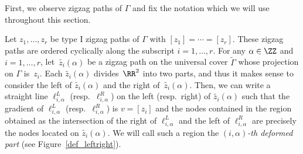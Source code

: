 First, we observe zigzag paths of $\Gamma$ and fix the notation which we will use throughout this section.

\begin{observation}\label{obs_deformed_part}
Let $z_1,\dots,z_r$ be type I zigzag paths of $\Gamma$ with $[z_1]=\cdots=[z_r]$.
These zigzag paths are ordered cyclically along the subscript $i=1,\dots,r$.
For any $\alpha\in\ZZ$ and $i=1,\dots,r$, let~$\widetilde{z_i}(\alpha)$ be a zigzag path on the universal cover $\widetilde{\Gamma}$ whose projection on $\Gamma$ is~$z_i$.
Each $\widetilde{z_i}(\alpha)$ divides~$\RR^2$ into two parts, and thus it makes sense to consider the left of $\widetilde{z_i}(\alpha)$ and the right of~$\widetilde{z_i}(\alpha)$.
Then, we can write a straight line $\ell_{i,\alpha}^L$ (resp.~$\ell_{i,\alpha}^R$) on the left (resp.\ right) of $\widetilde{z_i}(\alpha)$ such that
the gradient of $\ell_{i,\alpha}^L$ (resp.~$\ell_{i,\alpha}^R$) is $v=[z_i]$ and the nodes contained in the region obtained as the intersection of the right of $\ell_{i,\alpha}^L$ and the left of $\ell_{i,\alpha}^R$ are precisely the nodes located on $\widetilde{z_i}(\alpha)$.
We will call such a region the \emph{$(i,\alpha)$-th deformed part} (see Figure~\ref{def_leftright}).

\begin{figure}[h!]\centering
{}
\end{figure}
\end{observation}

